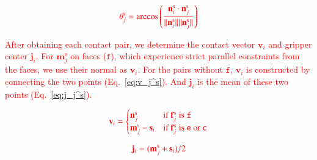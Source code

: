 \documentclass[journal]{IEEEtran}
\newcommand{\rev}[1]{\textcolor{red}{#1}}
\begin{document}
\begin{equation}
    \rev{\theta_j^\text{s} = \arccos \left( \frac{\mathbf{n}_i^\text{s} \cdot \mathbf{n}_j^\text{s}}{\|\mathbf{n}_i^\text{s}\| \|\mathbf{n}_j^\text{s}\|} \right)}
    \label{eq:theta_j^s}
\end{equation}


\rev{After obtaining each contact pair, we determine the contact vector $\mathbf{v}_i$ and gripper center $\mathbf{j}_i$.  For $\mathbf{m}_j^\text{s}$ on faces ($\mathtt{f}$), which experience strict parallel constraints from the faces, we use their normal as $\mathbf{v}_i$. For the pairs without $\mathtt{f}$, $\mathbf{v}_i$ is constructed by connecting the two points (Eq.~\ref{eq:v_j^s}). And $\mathbf{j}_i$ is the mean of these two points (Eq.~\ref{eq:j_j^s}).}

\begin{equation}
\rev{
    \mathbf{v}_i = \begin{cases}
        \mathbf{n}_j^\text{s} & \text{if } \mathbf{f}_j^\text{s} \text{ is } \mathtt{f} \\
        \mathbf{m}_j^\text{s} - \mathbf{s}_i & \text{if } \mathbf{f}_j^\text{s} \text{ is } \mathtt{e} \text{ or } \mathtt{c}
    \end{cases}}
    \label{eq:v_j^s}
\end{equation}

\begin{equation}
    \rev{\mathbf{j}_i = (\mathbf{m}_j^\text{s} + \mathbf{s}_i)/2}
    \label{eq:j_j^s}
\end{equation}

\end{document}
